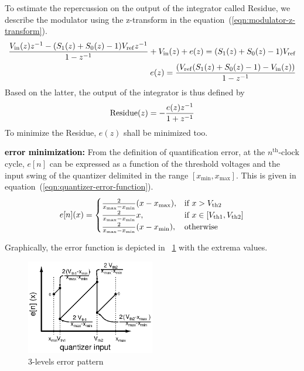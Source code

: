 To estimate the repercussion on the output of the integrator called Residue, we describe the modulator using the z-transform in the equation~(\ref{eqn:modulator-z-transform}).
\begin{eqnarray}
	\label{eqn:modulator-z-transform}
\frac{V_{\rm in}(z)z^{-1}-(S_1(z)+S_0(z)-1)V_{\rm ref}z^{-1}}{1-z^{-1}} + V_{\rm in}(z) + e(z) = (S_1(z)+S_0(z)-1)V_{\rm ref}  \\
e(z) = \frac{(V_{\rm ref}(S_1(z)+S_0(z)-1)-V_{\rm in}(z))}{1-z^{-1}}
\end{eqnarray}
Based on the latter, the output of the integrator is thus defined by 
\begin{equation}
	{\rm Residue}(z) = -\frac{e(z)z^{-1}}{1+z^{-1}}
\end{equation}
To minimize the Residue, \(e(z) \) shall be minimized too. 

\textbf{\textcolor{black}{error minimization:}}
From the definition of quantification error, at the $n^{\text{th}}$-clock cycle, \(e[n]\) can be expressed as a function of the threshold voltages and the input swing of the quantizer delimited in the range $[x_{\min}, x_{\max}]$. This is given in equation~(\ref{eqn:quantizer-error-function}).
\begin{equation}
	\label{eqn:quantizer-error-function}
	e[n](x) = 
\begin{cases}
	\frac{2}{x_{\max}-x_{\min}}(x-x_{\max}),& \text{if } x > V_{\rm th2} \\
	\frac{2}{x_{\max}-x_{\min}}x  ,& \text{if } x \in [V_{\rm th1}, V_{\rm th2}] \\
	\frac{2}{x_{\max}-x_{\min}}(x-x_{\min}),& \text{otherwise}
\end{cases}
\end{equation}

Graphically, the error function is depicted in \figurename~\ref{fig:3-levels-error-pattern} with the extrema values.
\begin{figure}[htp]
	\centering
	\includegraphics[width=0.5\textwidth]{Chapter4/Figs/3-levels-pattern.ps}
	\caption{3-levels error pattern}
	\label{fig:3-levels-error-pattern}
\end{figure}

